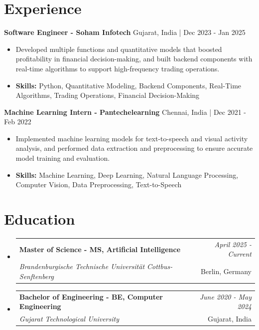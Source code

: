 \documentclass[a4paper,11pt]{article}
\makeatletter
\newcommand{\resumeSubheading}[4]{
\vspace{0.5mm}\item
    \begin{tabular*}{\linewidth}[t]{l@{\extracolsep{\fill}}r}
        \textbf{#1} & \textit{\footnotesize{#4}} \\
        \textit{\footnotesize{#3}} &  \footnotesize{#2}\\
    \end{tabular*}
    \vspace{-2.4mm}
}
\makeatother
\begin{document}
\section{\textbf{Experience}}


\vspace{1mm}
  \textbf{Software Engineer - Soham Infotech} \hfill Gujarat, India | Dec 2023 - Jan 2025
\vspace{-1.5mm} %
\begin{itemize}
  \item Developed multiple functions and quantitative models that boosted profitability in financial decision-making, and built backend components with real-time algorithms to support high-frequency trading operations.

\vspace{-2mm}
  \item \textbf{Skills:} Python, Quantitative Modeling, Backend Components, Real-Time Algorithms, Trading Operations, Financial Decision-Making
\end{itemize}

\vspace{1mm}
  \textbf{Machine Learning Intern - Pantechelearning} \hfill Chennai, India | Dec 2021 - Feb 2022
\vspace{-1.5mm} %
\begin{itemize}
  \item Implemented machine learning models for text-to-speech and visual activity analysis, and performed data extraction and preprocessing to ensure accurate model training and evaluation.
\vspace{-2mm}
  \item \textbf{Skills:} Machine Learning, Deep Learning, Natural Language Processing, Computer Vision, Data Preprocessing, Text-to-Speech
\end{itemize}\section{\textbf{Education}}
\vspace{-0.4mm}

\begin{itemize}[leftmargin=0.15in, label={}]
\resumeSubheading
{Master of Science - MS, Artificial Intelligence }{Berlin, Germany}
{Brandenburgische Technische Universität Cottbus-Senftenberg  }{April 2025 - Current}

\vspace{1.0mm} %
\resumeSubheading
{Bachelor of Engineering - BE, Computer Engineering  }{Gujarat, India}
{Gujarat Technological University }{June 2020 - May 2024}

\end{itemize}
\end{document}
